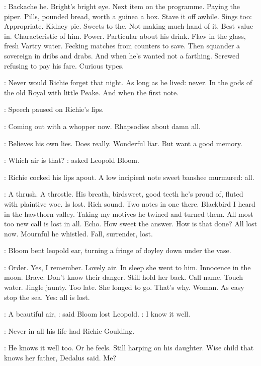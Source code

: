 \BloomInt:
Backache he. Bright's bright eye. Next item on the programme. Paying the
piper. Pills, pounded bread, worth a guinea a box. Stave it off awhile.
Sings too:
Appropriate. Kidney pie. Sweets to
the. Not making much hand of it. Best value in. Characteristic of him.
Power. Particular about his drink. Flaw in the glass, fresh Vartry water.
Fecking matches from counters to save.
Then squander a sovereign in dribs
and drabs. And when he's wanted not a farthing. Screwed refusing to pay
his fare. Curious types.

:
Never would Richie forget that night. As long as he lived: never. In
the gods of the old Royal with little Peake. And when the first note.

:
Speech paused on Richie's lips.

\BloomInt:
Coming out with a whopper now. Rhapsodies about damn all.

\BloomInt:
Believes his own lies.
Does really.
Wonderful liar.
But want a good memory.

\Bloom:
Which air is that?
:
asked Leopold Bloom.


:
Richie cocked his lips apout.
A low incipient note sweet banshee murmured:
all.

\BloomInt:
A thrush. A throstle.
His breath, birdsweet,
good teeth he's proud of,
fluted with plaintive woe.
Is lost.
Rich sound.
Two notes in one there.
Blackbird I heard in the hawthorn valley.
Taking my motives he twined and turned them.
All most too new call is lost in all.
Echo.
How sweet the answer.
How is that done?
All lost now.
Mournful he whistled.
Fall, surrender, lost.

:
Bloom bent leopold ear,
turning a fringe of doyley down under the vase.

\BloomInt:
Order.
Yes, I remember.
Lovely air.
In sleep she went to him.
Innocence in the moon.
Brave.
Don't know their danger.
Still hold her back.
Call name.
Touch water.
Jingle jaunty.
Too late.
She longed to go.
That's why.
Woman.
As easy stop the sea.
Yes: all is lost.

\Bloom:
A beautiful air,
:
said Bloom lost Leopold.
\Bloom:
I know it well.

:
Never in all his life had Richie Goulding.

\BloomInt:
He knows it well too. Or he feels. Still harping on his daughter. Wise
child that knows her father, Dedalus said. Me?

